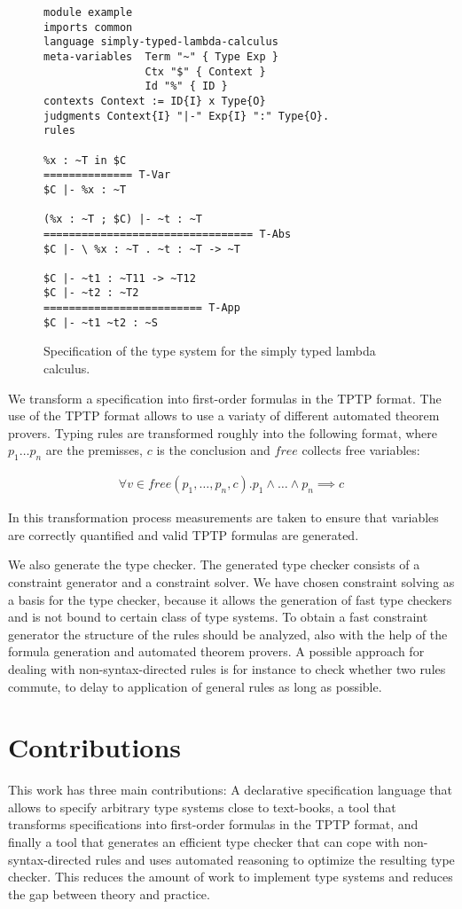 \documentclass[preprint]{sigplanconf}
\begin{document}
\begin{figure}
\begin{verbatim}
module example
imports common
language simply-typed-lambda-calculus
meta-variables 	Term "~" { Type Exp }
                Ctx "$" { Context }
                Id "%" { ID }
contexts Context := ID{I} x Type{O}
judgments Context{I} "|-" Exp{I} ":" Type{O}.
rules

%x : ~T in $C
============== T-Var
$C |- %x : ~T

(%x : ~T ; $C) |- ~t : ~T
================================= T-Abs
$C |- \ %x : ~T . ~t : ~T -> ~T

$C |- ~t1 : ~T11 -> ~T12
$C |- ~t2 : ~T2
========================= T-App
$C |- ~t1 ~t2 : ~S
\end{verbatim}
\caption{Specification of the type system for the simply typed lambda
  calculus.}
\label{fig:example-specification}
\end{figure}

We transform a specification into first-order formulas in the TPTP
\cite{Sutcliffe04tstpdata-exchange} format. The use of the TPTP format
allows to use a variaty of different automated theorem provers. Typing
rules are transformed roughly into the following format, where $p_1
\dots p_n$ are the premisses, $c$ is the conclusion and $free$
collects free variables:

\begin{align}
  \forall v \in free(p_1, \dots, p_n, c) . p_1 \land \dots \land p_n \implies  c 
\end{align}

In this transformation process measurements are taken to ensure that
variables are correctly quantified and valid TPTP formulas are
generated.

We also generate the type checker. The generated type checker consists
of a constraint generator and a constraint solver. We have chosen
constraint solving as a basis for the type checker, because it allows
the generation of fast type checkers and is not bound to certain class
of type systems. To obtain a fast constraint generator the structure
of the rules should be analyzed, also with the help of the formula
generation and automated theorem provers. A possible approach for
dealing with non-syntax-directed rules is for instance to check
whether two rules commute, to delay to application of general rules as
long as possible.
\section{Contributions}
This work has three main contributions: A declarative specification
language that allows to specify arbitrary type systems close to
text-books, a tool that transforms specifications into first-order
formulas in the TPTP format, and finally a tool that generates an
efficient type checker that can cope with non-syntax-directed rules
and uses automated reasoning to optimize the resulting type
checker. This reduces the amount of work to implement type systems and
reduces the gap between theory and practice.
\end{document}

